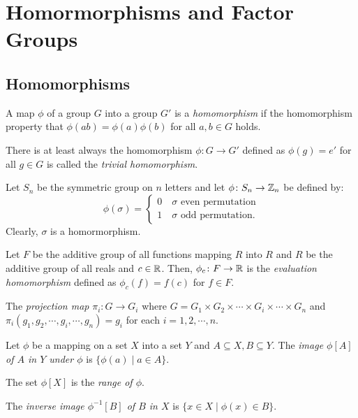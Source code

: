 \chapter{Homormorphisms and Factor Groups}

\section{Homomorphisms}

\begin{definition}[Homomorphism]
    A map $\phi$ of a group $G$ into a group $G'$ is a \emph{homomorphism} if the homomorphism property that $\phi(ab)=\phi(a)\phi(b)$ for all $a,b \in G$ holds.
\end{definition}
\begin{remark}
    There is at least always the homomorphism $\phi\colon G\to G'$ defined as $\phi(g) = e'$ for all $g \in G$ is called the \emph{trivial homomorphism}.
\end{remark}
\begin{example}
    Let $S_n$ be the symmetric group on $n$ letters and let $\phi\colon S_n\to\mathbb{Z}_n$ be defined by: \vspace{-10pt}\[\phi(\sigma)=\begin{cases*}0\quad\sigma\text{ even permutation} \\ 1\quad\sigma \text{ odd permutation.}\end{cases*}\] Clearly, $\sigma$ is a homormorphism.
\end{example}
\begin{example}
    Let $F$ be the additive group of all functions mapping $R$ into $R$ and $R$ be the additive group of all reals and $c \in \mathbb{R}$. Then, $\phi_c\colon F\to\mathbb{R}$ is the \emph{evaluation homomorphism} defined as $\phi_c(f) = f(c)$ for $f \in F$.
\end{example}
\begin{example}
    The \emph{projection map} $\pi_i\colon G\to G_i$ where $G = G_1\times G_2\times\cdots\times G_i\times\cdots\times G_n$ and $\pi_i(g_1,g_2,\cdots,g_i,\cdots,g_n)=g_i$ for each $i = 1,2,\cdots,n$. 
\end{example}
\begin{definition}
    Let $\phi$ be a mapping on a set $X$ into a set $Y$ and $A \subseteq X, B \subseteq Y$. The \emph{image $\phi[A]$ of $A$ in $Y$ under $\phi$} is $\{\phi(a)\mid a \in A\}$.

    The set $\phi[X]$ is the \emph{range of $\phi$}.

    The \emph{inverse image $\phi^{-1}[B]$ of $B$ in $X$} is $\{x\in X \mid \phi(x) \in B\}$.
\end{definition}
